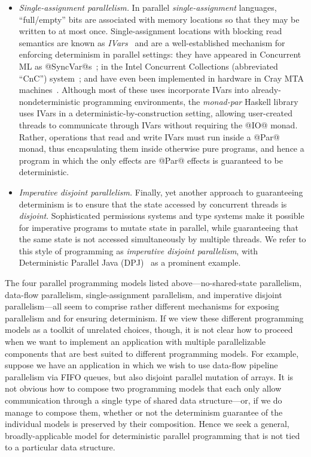 \begin{itemize}
\item \emph{Single-assignment parallelism.}  In parallel
  \emph{single-assignment} languages, ``full/empty'' bits are
  associated with memory locations so that they may be written to at
  most once. Single-assignment locations with blocking read semantics
  are known as \emph{IVars}~\cite{IStructures} and are a
  well-established mechanism for enforcing determinism in parallel
  settings: they have appeared in Concurrent ML as
  @SyncVar@s~\cite{reppy-cml-book}; in the Intel Concurrent
  Collections (abbreviated ``CnC'') system~\cite{CnC}; and have even
  been implemented in hardware in Cray MTA machines~\cite{cray-mta}.
  Although most of these uses incorporate IVars into
  already-nondeterministic programming environments, the
  \emph{monad-par} Haskell library~\cite{monad-par} uses IVars in a
  deterministic-by-construction setting, allowing user-created threads
  to communicate through IVars without requiring the @IO@ monad.
  Rather, operations that read and write IVars must run inside a @Par@
  monad, thus encapsulating them inside otherwise pure programs, and
  hence a program in which the only effects are @Par@ effects is
  guaranteed to be deterministic.

\item \emph{Imperative disjoint parallelism.}  Finally, yet another
  approach to guaranteeing determinism is to ensure that the state
  accessed by concurrent threads is \emph{disjoint}.  Sophisticated
  permissions systems and type systems make it possible for imperative
  programs to mutate state in parallel, while guaranteeing that the
  same state is not accessed simultaneously by multiple threads.  We
  refer to this style of programming as \emph{imperative disjoint
    parallelism}, with Deterministic Parallel Java
  (DPJ)~\cite{dpj-oopsla, dpj-hotpar09} as a prominent example.
\end{itemize}
The four parallel programming models listed above---no-shared-state
parallelism, data-flow parallelism, single-assignment parallelism, and
imperative disjoint parallelism---all seem to comprise rather different mechanisms for exposing parallelism
and for ensuring determinism.  If we view these different programming
models as a toolkit of unrelated choices, though, it is not clear how
to proceed when we want to implement an application with multiple
parallelizable components that are best suited to different
programming models.  For example, suppose we have an application in
which we wish to use data-flow pipeline parallelism via FIFO queues,
but also disjoint parallel mutation of arrays.  It is not obvious how
to compose two programming models that each only allow communication
through a single type of shared data structure---or, if we do manage
to compose them, whether or not the determinism guarantee of the
individual models is preserved by their composition.  Hence we seek a
general, broadly-applicable model for deterministic parallel
programming that is not tied to a particular data structure.

